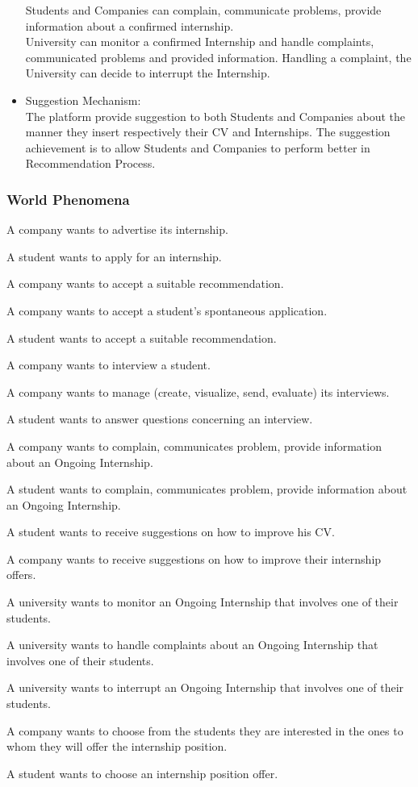 \begin{itemize}
    Students and Companies can complain, communicate problems, provide information about a confirmed internship.\\
    University can monitor a confirmed Internship and handle complaints, communicated problems and provided information.
    Handling a complaint, the University can decide to interrupt the Internship.
\item {\color{titleColor}Suggestion Mechanism:}\\
    The platform provide suggestion to both Students and Companies about the manner they insert respectively their CV and Internships. The suggestion achievement is to allow Students and Companies to perform better in Recommendation Process.
\end{itemize}

\subsubsection{World Phenomena}
\begin{enumerate}[label={\color{titleColor}[WP\arabic*]}]
\item A company wants to advertise its internship.
\item A student wants to apply for an internship.
\item A company wants to accept a suitable recommendation.
\item A company wants to accept a student's spontaneous application.
\item A student wants to accept a suitable recommendation.
\item A company wants to interview a student.
\item A company wants to manage (create, visualize, send, evaluate) its interviews.
\item A student wants to answer questions concerning an interview.
\item A company wants to complain, communicates problem, provide information about an Ongoing Internship.
\item A student wants to complain, communicates problem, provide information about an Ongoing Internship.
\item A student wants to receive suggestions on how to improve his CV.
\item A company wants to receive suggestions on how to improve their internship offers.
\item A university wants to monitor an Ongoing Internship that involves one of their students.
\item A university wants to handle complaints about an Ongoing Internship that involves one of their students.
\item A university wants to interrupt an Ongoing Internship that involves one of their students.
\item A company wants to choose from the students they are interested in the ones to whom they will offer the internship position.
\item A student wants to choose an internship position offer.

\end{enumerate}
